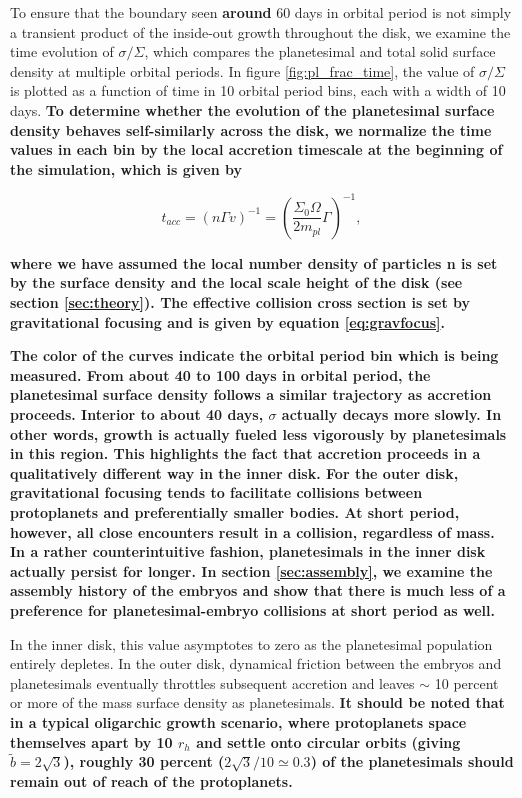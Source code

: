 \documentclass[twocolumn,linenumbers]{aastex63}
\begin{document}
To ensure that the boundary seen \textbf{around} 60 days in orbital period is not
simply a transient product of the inside-out growth throughout the
disk, we examine the time evolution of $\sigma/\Sigma$, which compares the planetesimal and total solid surface density at 
multiple orbital periods. In figure \ref{fig:pl_frac_time}, the value of
$\sigma/\Sigma$ is plotted as a function of time in 10 orbital period
bins, each with a width of 10 days. \textbf{To determine whether the evolution of the planetesimal surface density behaves self-similarly across the disk,
we normalize the time values in each bin by the local accretion timescale at the beginning of the simulation, which is given by}

\begin{equation}\label{eq:acctime}
	t_{acc} = \left( n \Gamma v \right)^{-1} = \left( \frac{\Sigma_{0} \Omega}{2 m_{pl}} \Gamma \right)^{-1},
\end{equation}

\noindent \textbf{where we have assumed the local number density of particles n is set by the surface density and the local scale height of the disk (see section \ref{sec:theory}). The effective collision cross section is set by gravitational focusing and is given by equation \ref{eq:gravfocus}.}

\textbf{The color of the curves indicate the orbital period bin which is being measured. From about 40 to 100 days in orbital period, the planetesimal surface 
density follows a similar trajectory as accretion proceeds. Interior to about 40 days, $\sigma$ actually decays more slowly. In other words, growth is actually 
fueled less vigorously by planetesimals in this region. This highlights the fact that accretion proceeds in a qualitatively different way in the inner disk. For the 
outer disk, gravitational focusing tends to facilitate collisions between protoplanets and preferentially smaller bodies. At short period, however, all close 
encounters result in a collision, regardless of mass. In a rather counterintuitive fashion, planetesimals in the inner disk actually persist for longer. In section 
\ref{sec:assembly}, we examine the assembly history of the embryos and show that there is much less of a preference for planetesimal-embryo collisions at 
short period as well.} 

In the inner disk, this value asymptotes to zero as the 
planetesimal population entirely depletes. In the outer disk, dynamical friction between the embryos and planetesimals 
eventually throttles subsequent accretion and leaves $\sim$ 10 percent or more of the mass surface density as planetesimals. \textbf{It 
should be noted that in a typical oligarchic growth scenario, where protoplanets space themselves apart by 10 $r_{h}$ and settle 
onto circular orbits (giving $\tilde{b} = 2 \sqrt{3}$), roughly 30 percent \textbf{($2\sqrt{3}/10 \simeq 0.3$)} of the planetesimals
should remain out of reach of the protoplanets.}
\end{document}
